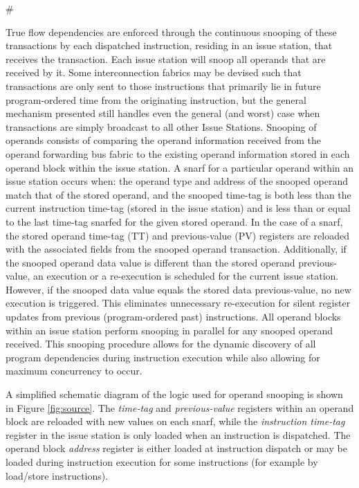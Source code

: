 #\documentclass[10pt,dvips]{article}
\begin{document}
True flow dependencies are enforced through the continuous snooping of
these transactions by each dispatched instruction, residing in an issue
station, that receives the transaction.
Each issue station will snoop all operands that are received by it.
Some 
interconnection fabrics may be devised such that
transactions are only sent to those instructions that primarily
lie in future program-ordered time from the originating instruction,
but the general mechanism presented 
still handles even the general (and worst)
case when transactions are simply broadcast to all other Issue Stations.  
Snooping of operands consists of comparing the operand information
received from the operand forwarding bus fabric to the existing
operand information stored in each operand block within the
issue station.
A snarf for a particular operand
within an issue station occurs when: the operand type and address
of the snooped operand match that of the stored operand, and
the snooped time-tag is both less than the current instruction
time-tag (stored in the issue station) and is less than or
equal to the last time-tag snarfed for the given stored operand.
In the case of a snarf, the stored operand time-tag (TT) and
previous-value (PV) registers are reloaded with the associated
fields from the snooped operand transaction.
Additionally, if the snooped operand data value is different
than the stored operand previous-value, an execution or a re-execution
is scheduled for the current issue station.
However, if the snooped data value equals the stored
data previous-value, no new execution is triggered.
This eliminates unnecessary re-execution for silent register updates
from previous (program-ordered past) instructions.
All operand blocks within an issue station perform snooping
in parallel for any snooped operand received.
This snooping procedure allows for the dynamic discovery of
all program dependencies during instruction execution while 
also allowing for maximum concurrency to occur.

A simplified schematic diagram of the logic used for operand snooping
is shown in Figure \ref{fig:source}.
The {\em time-tag} and
{\em previous-value} registers within an operand block
are reloaded with new values on each snarf,
while the
{\em instruction time-tag} register in the issue station
is only loaded when an instruction is dispatched.
The operand block {\em address} register is either loaded at instruction
dispatch or may be loaded during instruction execution for some
instructions
(for example by load/store instructions).
%
\begin{figure*}
\centering
\scriptsize {
}
\caption{{\em Snooping logic for operand updates.} 
The snooping
logic for one of several possible source operands is shown.
This logic would reside in each of the operand blocks within an 
issue station and they would all perform the snoop operation
simultaneously.
Just one operand forwarding bus is shown being snooped but
typically several forwarding buses are snooped simultaneously.}
\label{fig:source}
\end{figure*}
%
%
\vspace{-0.15in}
\end{document}

